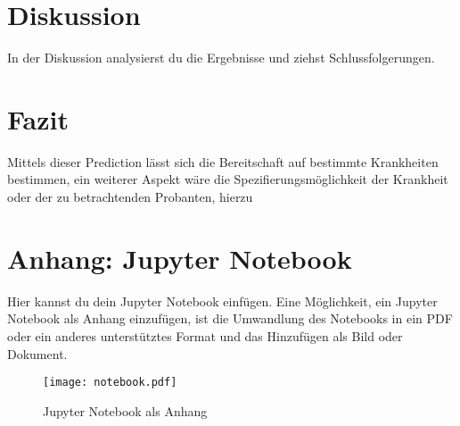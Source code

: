 \documentclass[a4paper,12pt]{article}
\begin{document}
\section{Diskussion}
In der Diskussion analysierst du die Ergebnisse und ziehst Schlussfolgerungen.

\section{Fazit}
Mittels dieser Prediction lässt sich die Bereitschaft auf bestimmte Krankheiten bestimmen, ein weiterer Aspekt wäre die
Spezifierungsmöglichkeit der Krankheit oder der zu betrachtenden Probanten, hierzu
\newpage

\appendix
\section{Anhang: Jupyter Notebook}
Hier kannst du dein Jupyter Notebook einfügen. Eine Möglichkeit, ein Jupyter Notebook als Anhang einzufügen, ist die Umwandlung des Notebooks in ein PDF oder ein anderes unterstütztes Format und das Hinzufügen als Bild oder Dokument.

\begin{figure}[h!]
    \centering
    \texttt{[image: notebook.pdf]}
    \caption{Jupyter Notebook als Anhang}
\end{figure}
\end{document}

